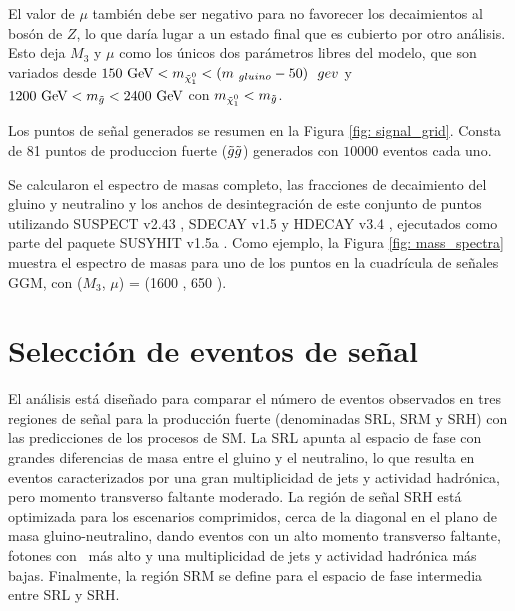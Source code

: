 El valor de $\mu$ también debe ser negativo para no favorecer los decaimientos al bosón de $Z$, lo que daría lugar a un estado final que es cubierto por otro análisis. Esto deja $M_3$ y $\mu$ como los únicos dos parámetros libres del modelo, que son variados desde $150\ \gev<m_{\ninoone}<(m_{\ gluino} - 50) \ \ gev $ y $1200\ \gev<m_{\gluino}<2400\ \gev$
con $m_{\ninoone}<m_{\gluino}$.



Los puntos de señal generados se resumen en la Figura \ref{fig: signal_grid}. Consta de 81 puntos de produccion fuerte ($\tilde{g}\tilde{g}$) generados con $10000$ eventos cada uno.


Se calcularon el espectro de masas completo, las fracciones de decaimiento del gluino y neutralino y los anchos de desintegración de este conjunto de puntos utilizando SUSPECT v2.43 \cite{Djouadi2007426}, SDECAY v1.5 \cite{Muhlleitner: 2004mka} y HDECAY v3.4 \cite{Djouadi: 1997yw},
ejecutados como parte del paquete SUSYHIT v1.5a \cite{Djouadi: 2006bz}.
Como ejemplo, la Figura \ref{fig: mass_spectra} muestra el espectro de masas para uno de los puntos en la cuadrícula de señales GGM, con ($M_3$, $\mu$) = (1600 {\gev}, 650 \gev). 



\section{Selección de eventos de señal}

El análisis está diseñado para comparar el número de eventos observados en tres regiones de señal para la producción fuerte (denominadas SRL, SRM y SRH) con las predicciones de los procesos de SM.
La SRL apunta al espacio de fase con grandes diferencias de masa entre el gluino y el neutralino, lo que resulta en eventos caracterizados por una gran multiplicidad de jets y actividad hadrónica, pero momento transverso faltante moderado. La región de señal SRH está optimizada para los escenarios comprimidos, cerca de la diagonal en el plano de masa gluino-neutralino, dando eventos con un alto momento transverso faltante, fotones con \pt\ más alto y una multiplicidad de jets y actividad hadrónica más bajas. Finalmente, la región SRM se define para el espacio de fase intermedia entre SRL y SRH.

